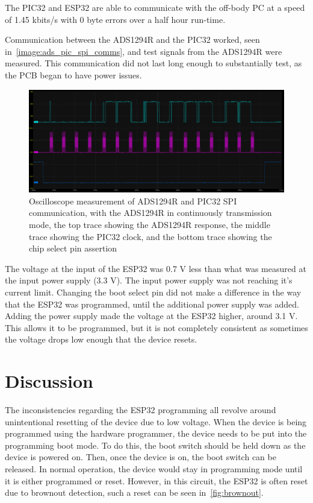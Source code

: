 The PIC32 and ESP32 are able to communicate with the off-body PC at a speed of 1.45 kbits/s with 0 byte errors over a half hour run-time.

Communication between the ADS1294R and the PIC32 worked, seen in~\autoref{image:ads_pic_spi_comms}, and test signals from the ADS1294R were measured.
This communication did not last long enough to substantially test, as the PCB began to have power issues.

\begin{figure}[!ht]
  \caption{Oscilloscope measurement of ADS1294R and PIC32 SPI communication, with the ADS1294R in continuously transmission mode,
    the top trace showing the ADS1294R response, the middle trace showing the PIC32 clock,
    and the bottom trace showing the chip select pin assertion}\label{image:ads_pic_spi_comms}
  \centering
  \includegraphics[width=1\columnwidth]{chapters/development/results/ADS_SPI_COMMS_WORKING}
\end{figure}

The voltage at the input of the ESP32 was 0.7 V less than what was measured at the input power supply (3.3 V).
The input power supply was not reaching it's current limit.
Changing the boot select pin did not make a difference in the way that the ESP32 was programmed, until the additional power supply was added.
Adding the power supply made the voltage at the ESP32 higher, around 3.1 V.
This allows it to be programmed, but it is not completely consistent as sometimes the voltage drops low enough that the device resets.


\section{Discussion}
The inconsistencies regarding the ESP32 programming all revolve around unintentional resetting of the device due to low voltage.
When the device is being programmed using the hardware programmer, the device needs to be put into the programming boot mode.
To do this, the boot switch should be held down as the device is powered on. Then, once the device is on, the boot switch can be released.
In normal operation, the device would stay in programming mode until it is either programmed or reset.
However, in this circuit, the ESP32 is often reset due to brownout detection, such a reset can be seen in~\autoref{fig:brownout}.


